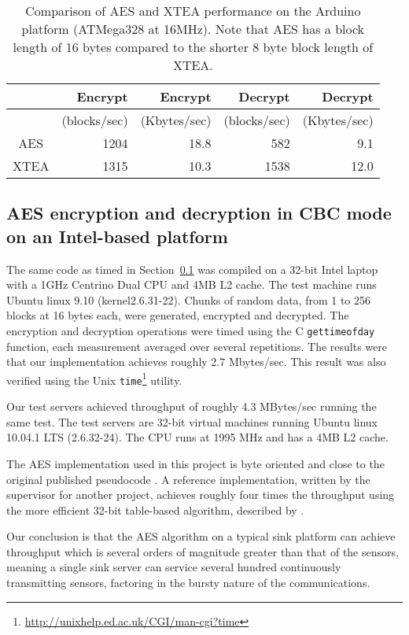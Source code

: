 \begin{table}[h]
\begin{center}
\begin{tabular}{|c|r|r|r|r|}
\hline  & Encrypt & Encrypt & Decrypt & Decrypt \\
\hline  & (blocks/sec) & (Kbytes/sec) & (blocks/sec) & (Kbytes/sec) \\ 
\hline AES & 1204 & 18.8 & 582 & 9.1 \\ 
\hline XTEA & 1315 & 10.3 & 1538 & 12.0 \\ 
\hline 
\end{tabular}
\end{center}
\caption{Comparison of AES and XTEA performance on the Arduino platform (ATMega328 at 16MHz). Note that AES has a block length of 16 bytes compared to the shorter 8 byte block length of XTEA.}
\label{tab:aes-xtea-comparison}
\end{table} 

\subsection{AES encryption and decryption in CBC mode on an Intel-based platform}

The same code as timed in Section~\ref{} was compiled on a 32-bit Intel laptop with a 1GHz Centrino Dual CPU and 4MB L2 cache. The test machine runs Ubuntu linux 9.10 (kernel2.6.31-22). Chunks of random data, from 1 to 256 blocks at 16 bytes each, were generated, encrypted and decrypted. The encryption and decryption operations were timed using the C \texttt{gettimeofday} function, each measurement averaged over several repetitions. The results were that our implementation achieves roughly 2.7 Mbytes/sec. This result was also verified using the Unix \texttt{time}\footnote{\url{http://unixhelp.ed.ac.uk/CGI/man-cgi?time}} utility.

Our test servers achieved throughput of roughly 4.3 MBytes/sec running the same test. The test servers are 32-bit virtual machines running Ubuntu linux 10.04.1 LTS (2.6.32-24). The CPU runs at 1995 MHz and has a 4MB L2 cache.

The AES implementation used in this project is byte oriented and close to the original published pseudocode . A reference implementation, written by the supervisor for another project, achieves roughly four times the throughput using the more efficient 32-bit table-based algorithm, described by .

Our conclusion is that the AES algorithm on a typical sink platform can achieve throughput which is several orders of magnitude greater than that of the sensors, meaning a single sink server can service several hundred continuously transmitting sensors, factoring in the bursty nature of the communications.

